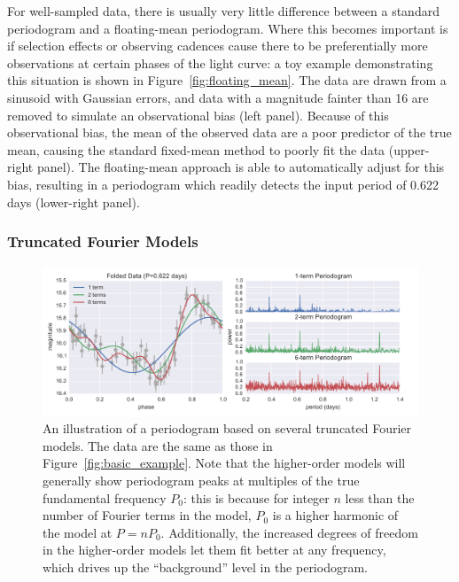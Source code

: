 \documentclass[12pt,preprint]{aastex}
\newcommand{\Fig}[1]{Figure~\ref{fig:#1}}
\newcommand{\fig}[1]{\Fig{#1}}
\newcommand{\figlabel}[1]{\label{fig:#1}}
\newcommand{\sectlabel}[1]{\label{sect:#1}}
\begin{document}
For well-sampled data, there is usually very little difference between a standard periodogram and a floating-mean periodogram. Where this becomes important is if selection effects or observing cadences cause there to be preferentially more observations at certain phases of the light curve: a toy example demonstrating this situation is shown in \fig{floating_mean}. The data are drawn from a sinusoid with Gaussian errors, and data with a magnitude fainter than 16 are removed to simulate an observational bias (left panel). Because of this observational bias, the mean of the observed data are a poor predictor of the true mean, causing the standard fixed-mean method to poorly fit the data (upper-right panel). The floating-mean approach is able to automatically adjust for this bias, resulting in a periodogram which readily detects the input period of 0.622 days (lower-right panel).


\subsubsection{Truncated Fourier Models}
\sectlabel{multiterm}

\begin{figure}
  \centering
  \includegraphics[width=\textwidth]{fig03.pdf}
  \caption{
    An illustration of a periodogram based on several truncated Fourier models.
    The data are the same as those in \fig{basic_example}. Note that the
    higher-order models will generally show periodogram peaks at multiples
    of the true fundamental frequency $P_0$: this is because for integer $n$
    less than the number of Fourier terms in the model, $P_0$ is a higher
    harmonic of the model at $P=nP_0$. Additionally, the increased degrees of
    freedom in the higher-order models let them fit better at any frequency,
    which drives up the ``background'' level in the periodogram.
  }
  \figlabel{multiterm_example}
\end{figure}
\end{document}
